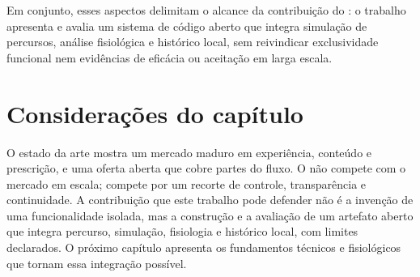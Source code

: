Em conjunto, esses aspectos delimitam o alcance da contribuição do \argus{}: o
trabalho apresenta e avalia um sistema de código aberto que integra simulação
de percursos, análise fisiológica e histórico local, sem reivindicar
exclusividade funcional nem evidências de eficácia ou aceitação em larga escala.

\section{Considerações do capítulo}
\label{sec:consideracoes-estado-arte}

O estado da arte mostra um mercado maduro em experiência, conteúdo e
prescrição, e uma oferta aberta que cobre partes do fluxo. O \argus{} não
compete com o mercado em escala; compete por um recorte de controle,
transparência e continuidade. A contribuição que este trabalho pode defender
não é a invenção de uma funcionalidade isolada, mas a construção e a avaliação
de um artefato aberto que integra percurso, simulação, fisiologia e histórico
local, com limites declarados. O próximo capítulo apresenta os fundamentos
técnicos e fisiológicos que tornam essa integração possível.
